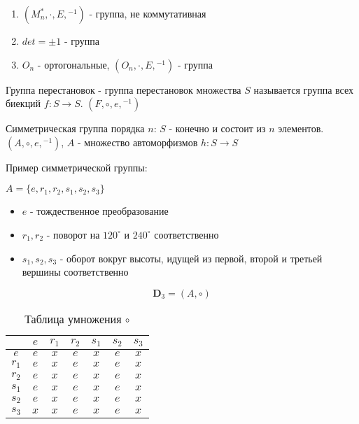 \documentclass[../main/document.tex]{subfiles}
\begin{document}
\begin{exm}
\begin{enumerate}
\item $(M^*_n,\cdot,E,{ }^{-1})$ - группа, не коммутативная
\item $det=\pm 1$ - группа
\item $O_n$ - ортогональные, $(O_n,\cdot,E,{ }^{-1})$ - группа
\end{enumerate}
\end{exm}
\begin{dfn}
Группа перестановок - группа перестановок множества $S$ называется группа всех биекций $f:S\rightarrow S$. $(F,\circ,e,{ }^{-1})$
\end{dfn}
\begin{exm}
\end{exm}
\begin{dfn}
Симметрическая группа порядка $n$: $S$ - конечно и состоит из $n$ элементов. $(A,\circ,e,{ }^{-1})$, $A$ - множество автоморфизмов $h:S\rightarrow S$
\end{dfn}
\begin{exm} \label{TriangleGroup}
Пример симметрической группы:


$A=\{e,r_1,r_2,s_1,s_2,s_3\}$
\begin{itemize}

  \item $e$ - тождественное преобразование
  \item $r_1, r_2$ - поворот на $120^{\circ}$ и $240^{\circ}$ соответственно
  \item $s_1, s_2, s_3$ - оборот вокруг высоты, идущей из первой, второй и третьей вершины соответственно
\end{itemize}

$$\mathbf{D}_3=(A,\circ)$$

\begin{table}[H]
\centering
\caption*{Таблица умножения $\circ$}
\renewcommand*{\arraystretch}{1.4}
\begin{tabular}{c|c|c|c|c|c|c}
  & $e$ & $r_1$ & $r_2$ & $s_1$& $s_2$ & $s_3$  \\ \hline
$e$ & $e$ & $x$ & $e$ & $x$& $e$ & $x$ \\ \hline
$r_1$ & $e$ & $x$ & $e$ & $x$& $e$ & $x$ \\ \hline
$r_2$ & $e$ & $x$ & $e$ & $x$& $e$ & $x$ \\ \hline
$s_1$ & $e$ & $x$ & $e$ & $x$& $e$ & $x$ \\ \hline
$s_2$ & $e$ & $x$ & $e$ & $x$& $e$ & $x$ \\ \hline
$s_3$ & $x$ & $x$& $e$ & $x$& $e$ & $x$ \\ 
\end{tabular}
\end{table}
\end{exm}
\end{document}
